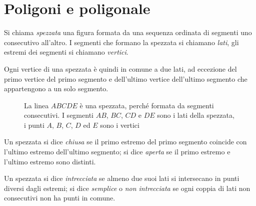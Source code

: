 \vspazio\ovalbox{\risolvii \ref{ese:1.104}, \ref{ese:1.105}, 
\ref{ese:1.106}, \ref{ese:1.107}, \ref{ese:1.108}, \ref{ese:1.109}, 
\ref{ese:1.110}, \ref{ese:1.111}, \ref{ese:1.112}, \ref{ese:1.113}, 
\ref{ese:1.114},}

\ovalbox{\ref{ese:1.115}, \ref{ese:1.116}, \ref{ese:1.117}, 
\ref{ese:1.118}, \ref{ese:1.119}, \ref{ese:1.120}, \ref{ese:1.121}, 
\ref{ese:1.122}, \ref{ese:1.123}, \ref{ese:1.124}}


\section{Poligoni e poligonale}\label{sect:poligoni}

\begin{definizione}
Si chiama \emph{spezzata} una figura formata da una sequenza ordinata 
di segmenti uno consecutivo all'altro. I segmenti che formano la 
spezzata si chiamano \emph{lati}, gli estremi dei segmenti si 
chiamano \emph{vertici}.
\end{definizione}

Ogni vertice di una spezzata è quindi in comune a due lati, ad 
eccezione del primo vertice del primo segmento e dell'ultimo vertice 
dell'ultimo segmento che appartengono a un solo segmento.


\begin{inaccessibleblock}
 \begin{figure}[htb]
\centering
\caption{La linea \(ABCDE\) è una spezzata, perché formata da segmenti 
consecutivi. I segmenti \(AB\), \(BC\), \(CD\) e \(DE\) sono i lati della 
spezzata, i punti \(A\), \(B\), \(C\), \(D\) ed \(E\) sono i vertici}
\end{figure}
\end{inaccessibleblock}

\begin{definizione}
Un spezzata si dice \emph{chiusa} se il primo estremo del primo 
segmento coincide con l'ultimo estremo dell'ultimo segmento; si dice 
\emph{aperta} se il primo estremo e l'ultimo estremo sono distinti.
\end{definizione}

\begin{definizione}
Un spezzata si dice \emph{intrecciata} se almeno due suoi lati si 
intersecano in punti diversi dagli estremi; si dice \emph{semplice} o 
\emph{non intrecciata} se ogni coppia di lati non consecutivi non ha 
punti in comune.
\end{definizione}


